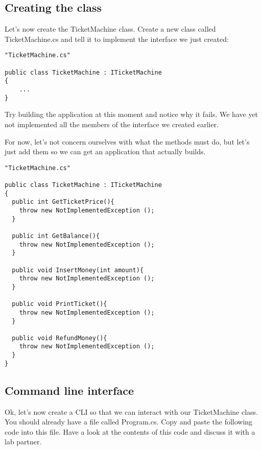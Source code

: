 \documentclass{article}
\begin{document}
    \subsection{Creating the class}
    Let’s now create the TicketMachine class. Create a new class called TicketMachine.cs and   tell it to implement the interface we just created:
    \begin{lstlisting}
"TicketMachine.cs"

public class TicketMachine : ITicketMachine
{
    ...
}
    \end{lstlisting}
    Try building the application at this moment and notice why it fails. We have yet not implemented all the members of the interface we created earlier.

    For now, let’s not concern ourselves with what the methods must do, but let’s just add them so we can get an application that actually builds. 

    \begin{lstlisting}
"TicketMachine.cs"

public class TicketMachine : ITicketMachine
{
  public int GetTicketPrice(){
    throw new NotImplementedException ();
  }

  public int GetBalance(){
    throw new NotImplementedException ();
  }

  public void InsertMoney(int amount){
    throw new NotImplementedException ();
  }

  public void PrintTicket(){
    throw new NotImplementedException ();
  }

  public void RefundMoney(){
    throw new NotImplementedException ();
  }
}
    \end{lstlisting}

\subsection{Command line interface}
Ok, let’s now create a CLI so that we can interact with our TicketMachine class. You should already have a file called Program.cs. Copy and paste the following code into this file. Have a look at the contents of this code and discuss it with a lab partner.  
\end{document}
